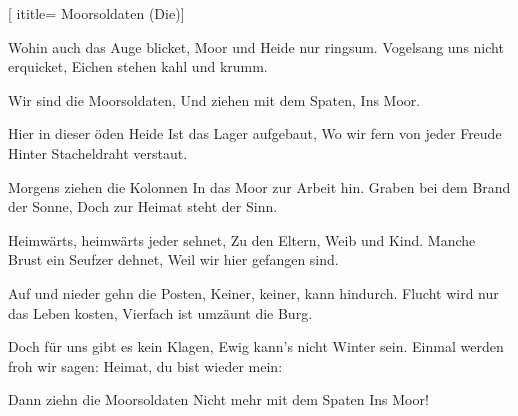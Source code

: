  [
ititle= {Moorsoldaten (Die)}]


\beginverse
Wohin auch das Auge blicket,
Moor und Heide nur ringsum.
Vogelsang uns nicht erquicket,
Eichen stehen kahl und krumm.
\endverse

\beginchorus
Wir sind die Moorsoldaten,
Und ziehen mit dem Spaten,
Ins Moor.
\endchorus

\beginverse
Hier in dieser öden Heide
Ist das Lager aufgebaut,
Wo wir fern von jeder Freude
Hinter Stacheldraht verstaut.
\endverse

\beginverse
Morgens ziehen die Kolonnen
In das Moor zur Arbeit hin.
Graben bei dem Brand der Sonne,
Doch zur Heimat steht der Sinn.
\endverse

\beginverse
Heimwärts, heimwärts jeder sehnet,
Zu den Eltern, Weib und Kind.
Manche Brust ein Seufzer dehnet,
Weil wir hier gefangen sind.
\endverse

\beginverse
Auf und nieder gehn die Posten,
Keiner, keiner, kann hindurch.
Flucht wird nur das Leben kosten,
Vierfach ist umzäunt die Burg.
\endverse

\beginverse
Doch für uns gibt es kein Klagen,
Ewig kann's nicht Winter sein.
Einmal werden froh wir sagen:
Heimat, du bist wieder mein:
\endverse

\beginchorus
Dann ziehn die Moorsoldaten
Nicht mehr mit dem Spaten
Ins Moor! 
\endchorus

\endsong